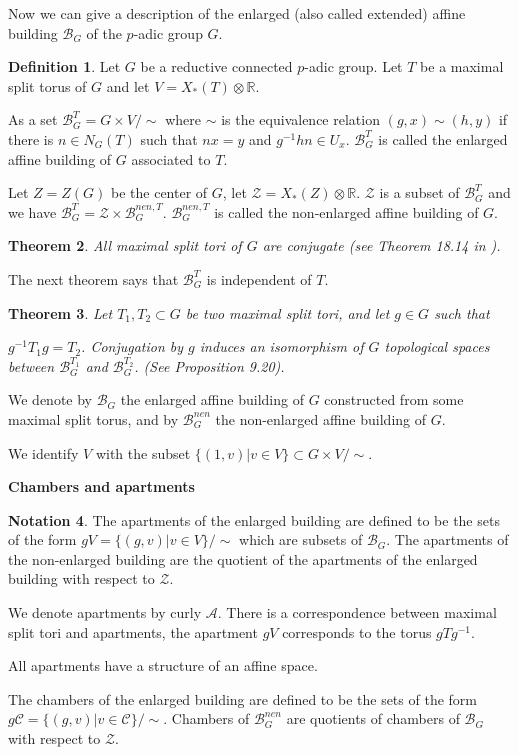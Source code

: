 \documentclass[12pt]{article}
\newcommand{\A}{\mathcal{A}}
\newcommand{\B}{\mathcal{B}}
\newcommand{\C}{\mathcal{C}}
\newcommand{\<}{\langle}
\renewcommand{\>}{\rangle}
\theoremstyle{plain}
\newtheorem{theorem}{Theorem}[section] %
\theoremstyle{definition}
\newtheorem{Not}[theorem]{Notation}
\newtheorem{defn}[theorem]{Definition} %
\begin{document}
 

Now we can give a description of the enlarged (also called extended) affine building $\B_G$ of the $p$-adic group $G$.

\begin{defn}
Let $G$ be a reductive connected $p$-adic group. Let $T$ be a maximal split torus of $G$ and let $V=X_*(T)\otimes \mathbb{R}$.

As a set $\B^{T}_G=G\times V/\sim$ where $\sim$ is the equivalence relation $(g,x)\sim (h,y)$ if there is $n\in N_G(T)$ such that $nx=y$ and $g^{-1}hn\in U_x$. $\B^{T}_G$ is called the enlarged affine building of $G$ associated to $T$.

Let $Z=Z(G)$ be the center of $G$, let $\mathcal{Z}=X_*(Z)\otimes \mathbb{R}$. $\mathcal{Z}$ is a subset of $\B^{T}_G$ and we have $\B^{T}_G=\mathcal{Z}\times \B^{nen,T}_G$. $\B^{nen,T}_G$ is called the non-enlarged affine building of $G$.  
\end{defn}

\begin{theorem}
    All maximal split tori of $G$ are conjugate (see Theorem 18.14 in \cite{Milne_2017}).
\end{theorem}


The next theorem says that $\B^T_G$ is independent of $T$.

\begin{theorem}\label{2.9}
Let $T_1,T_2\subset G$ be two maximal split tori, and let $g\in G$ such that

$g^{-1}T_1g=T_2$. Conjugation by $g$ induces an isomorphism of $G$ topological spaces between  $\B^{T_1}_G$ and $\B^{T_2}_G$. (See \cite{Landvogt1995ACO} Proposition 9.20).
\end{theorem}

We denote by $\B_{G}$ the enlarged affine building of $G$ constructed from some maximal split torus, and by $\B^{nen}_{G}$ the non-enlarged affine building of $G$.

We identify $V$ with the subset $\{(1,v)|v\in V\}\subset G\times V/\sim$.

\textbf{Chambers and apartments}


\begin{Not}\label{apartments}
The apartments of the enlarged building are defined to be the sets of the form $gV=\{(g,v)|v\in V\}/\sim$ which are subsets of $\B_G$. The apartments of the non-enlarged building are the quotient of the apartments of the enlarged building with respect to $\mathcal{Z}$.

We denote apartments by curly $\A$.  There is a correspondence between maximal split tori and apartments, the apartment $gV$ corresponds to the torus $gTg^{-1}$.

All apartments have a structure of an affine space.

The chambers of the enlarged building are defined to be the sets of the form $g\C=\{(g,v)|v\in \C\}/\sim$. Chambers of $\B^{nen}_G$ are quotients of chambers of $\B_G$ with respect to $\mathcal{Z}$.
\end{Not}
\end{document}
